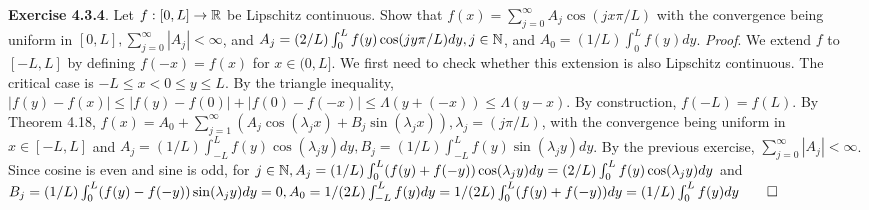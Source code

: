 {\bf Exercise 4.3.4}. Let $f: [0,L] \rightarrow \mathbb{R}$ be Lipschitz continuous. Show that $f(x)=\sum_{j=0}^{\infty}A_j\cos(jx\pi/L)$ with the convergence being uniform in $[0,L], \sum_{j=0}^{\infty}|A_j|<\infty$, and $A_j=(2/L)\int_0^L f(y)\cos(jy\pi/L)dy, j \in \mathbb{N}$, and $A_0=(1/L)\int_0^L f(y)dy$. {\it Proof}. We extend $f$ to $[-L,L]$ by defining $f(-x)=f(x)$ for $x \in (0,L]$. We first need to check whether this extension is also Lipschitz continuous. The critical case is $-L \leq x <0 \leq y \leq L$. By the triangle inequality, $|f(y)-f(x)| \leq |f(y)-f(0)|+|f(0)-f(-x)|\leq \Lambda(y+(-x)) \leq \Lambda (y-x)$. By construction, $f(-L)=f(L)$. By Theorem 4.18, $f(x)=A_0+\sum_{j=1}^{\infty}(A_j\cos(\lambda_jx) + B_j \sin(\lambda_jx)), \lambda_j=(j\pi/L)$, with the convergence being uniform in $x \in [-L,L]$ and $A_j=(1/L)\int_{-L}^L f(y)\cos(\lambda_jy)dy, B_j=(1/L)\int_{-L}^L f(y)\sin(\lambda_jy)dy$. By the previous exercise, $\sum_{j=0}^{\infty}|A_j|<\infty$. Since cosine is even and sine is odd, for $j \in \mathbb{N}, A_j=(1/L)\int_0^L( f(y)+f(-y))\cos(\lambda_jy)dy=(2/L)\int_0^L f(y)\cos(\lambda_jy)dy$ and  $B_j=(1/L)\int_0^L (f(y)-f(-y))\sin(\lambda_jy)dy= 0, A_0=1/(2L)\int_{-L}^L f(y)dy=1/(2L)\int_0^L (f(y)+f(-y))dy=(1/L)\int_0^L f(y)dy \qed$